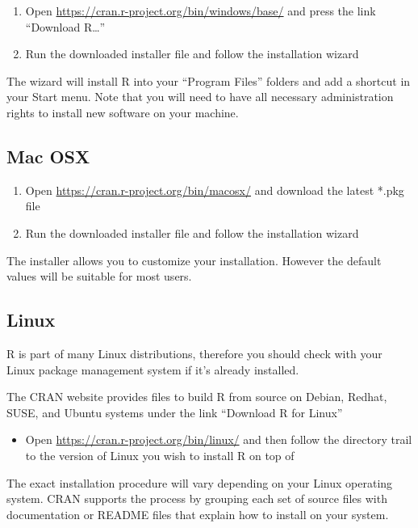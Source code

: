 \documentclass[
]{book}
\providecommand{\tightlist}{%
  \setlength{\itemsep}{0pt}\setlength{\parskip}{0pt}}
\begin{document}
\begin{enumerate}
\def\labelenumi{\arabic{enumi}.}
\tightlist
\item
  Open \url{https://cran.r-project.org/bin/windows/base/} and press the link ``Download R\ldots{}''
\item
  Run the downloaded installer file and follow the installation wizard
\end{enumerate}

The wizard will install R into your ``Program Files'' folders and add a shortcut in your Start menu. Note that you will need to have all necessary administration rights to install new software on your machine.

\hypertarget{mac-osx}{%
\subsection{Mac OSX}\label{mac-osx}}

\begin{enumerate}
\def\labelenumi{\arabic{enumi}.}
\tightlist
\item
  Open \url{https://cran.r-project.org/bin/macosx/} and download the latest *.pkg file
\item
  Run the downloaded installer file and follow the installation wizard
\end{enumerate}

The installer allows you to customize your installation. However the default values will be suitable for most users.

\hypertarget{linux}{%
\subsection{Linux}\label{linux}}

R is part of many Linux distributions, therefore you should check with your Linux package management system if it's already installed.

The CRAN website provides files to build R from source on Debian, Redhat, SUSE, and Ubuntu systems under the link ``Download R for Linux''

\begin{itemize}
\tightlist
\item
  Open \url{https://cran.r-project.org/bin/linux/} and then follow the directory trail to the version of Linux you wish to install R on top of
\end{itemize}

The exact installation procedure will vary depending on your Linux operating system. CRAN supports the process by grouping each set of source files with documentation or README files that explain how to install on your system.
\end{document}
